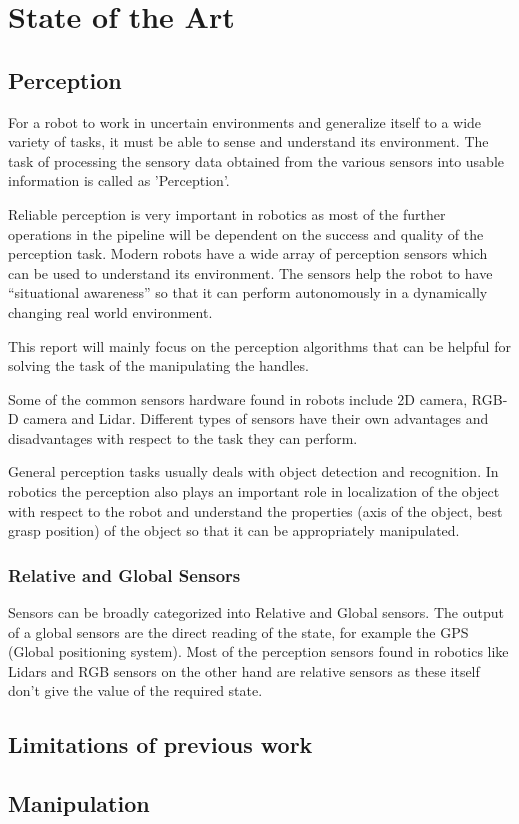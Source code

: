 

    \chapter{State of the Art}

    \section{Perception}
    
    For a robot to work in uncertain environments and generalize itself to a wide variety of tasks, it must be able to sense and understand its environment. The task of processing the sensory data obtained from the various sensors into usable information is called as 'Perception'.
    
    Reliable perception is very important in robotics as most of the further operations in the pipeline will be dependent on the success and quality of the perception task. Modern robots have a wide array of perception sensors which can be used to understand its environment. The sensors help the robot to have “situational awareness” so that it can perform autonomously in a dynamically changing real world environment.
    
    This report will mainly focus on the perception algorithms that can be helpful for solving the task of the manipulating the handles.
    
    Some of the common sensors hardware found in robots include 2D camera, RGB-D camera and Lidar. Different types of sensors have their own advantages and disadvantages with respect to the task they can perform.
    
    General perception tasks usually deals with object detection and recognition. In robotics the perception also plays an important role in localization of the object with respect to the robot and understand the properties (axis of the object, best grasp position) of the object so that it can be appropriately manipulated.
    
    \subsection{Relative and Global Sensors}\cite{2011}
    Sensors can be broadly categorized into Relative and Global sensors. The output of a global sensors are the direct reading of the state, for example the GPS (Global positioning system). Most of the perception sensors found in robotics like Lidars and RGB sensors on the other hand are relative sensors as these itself don't give the value of the required state.  
    
    \section{Limitations of previous work}
    
    \section{Manipulation}

    

